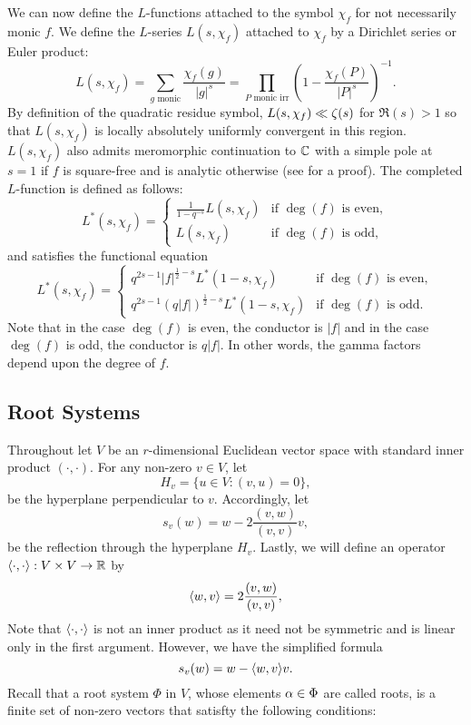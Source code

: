 \documentclass[12pt,reqno,oneside]{amsart}
\begin{document}
        We can now define the $L$-functions attached to the symbol $\chi_{f}$ for not necessarily monic $f$. We define the $L$-series $L(s,\chi_{f})$ attached to $\chi_{f}$ by a Dirichlet series or Euler product:
        \[
            L(s,\chi_{f}) = \sum_{\text{$g$ monic}}\frac{\chi_{f}(g)}{|g|^{s}} = \prod_{\text{$P$ monic irr}}\left(1-\frac{\chi_{f}(P)}{|P|^{s}}\right)^{-1}.
        \]
        By definition of the quadratic residue symbol, $L(s,\chi_{f}) \ll \zeta(s)$ for $\Re(s) > 1$ so that $L(s,\chi_{f})$ is locally absolutely uniformly convergent in this region. $L(s,\chi_{f})$ also admits meromorphic continuation to $\mathbb{C}$ with a simple pole at $s = 1$ if $f$ is square-free and is analytic otherwise (see \cite{R} for a proof). The completed $L$-function is defined as follows:
        \[
            L^{\ast}(s,\chi_{f}) = \begin{cases} \frac{1}{1-q^{-s}}L(s,\chi_{f}) & \text{if $\deg(f)$ is even}, \\ L(s,\chi_{f}) & \text{if $\deg(f)$ is odd}, \end{cases}
        \]
        and satisfies the functional equation
        \[
            L^{\ast}(s,\chi_{f}) = \begin{cases} q^{2s-1}|f|^{\frac{1}{2}-s}L^{\ast}(1-s,\chi_{f}) & \text{if $\deg(f)$ is even}, \\ q^{2s-1}(q|f|)^{\frac{1}{2}-s}L^{\ast}(1-s,\chi_{f}) & \text{if $\deg(f)$ is odd}. \end{cases}
        \]
        Note that in the case $\deg(f)$ is even, the conductor is $|f|$ and in the case $\deg(f)$ is odd, the conductor is $q|f|$. In other words, the gamma factors depend upon the degree of $f$.
    \subsection*{Root Systems}
        Throughout let $V$ be an $r$-dimensional Euclidean vector space with standard inner product $(\cdot,\cdot)$. For any non-zero $v \in V$, let
        \[
            H_{v} = \{u \in V:(v,u) = 0\},
        \]
        be the hyperplane perpendicular to $v$. Accordingly, let
        \[
            s_{v}(w) = w-2\frac{(v,w)}{(v,v)}v, 
        \]
        be the reflection through the hyperplane $H_{v}$. Lastly, we will define an operator $\langle\cdot,\cdot\rangle:V \times V \to \mathbb{R}$ by
        \[
            \langle w,v\rangle = 2\frac{(v,w)}{(v,v)},
        \]
        Note that $\langle\cdot,\cdot\rangle$ is not an inner product as it need not be symmetric and is linear only in the first argument. However, we have the simplified formula
        \[
            s_{v}(w) = w-\langle w,v\rangle v.
        \]
        Recall that a root system $\Phi$ in $V$, whose elements $\alpha \in \Phi$ are called roots, is a finite set of non-zero vectors that satisfty the following conditions:
\end{document}
